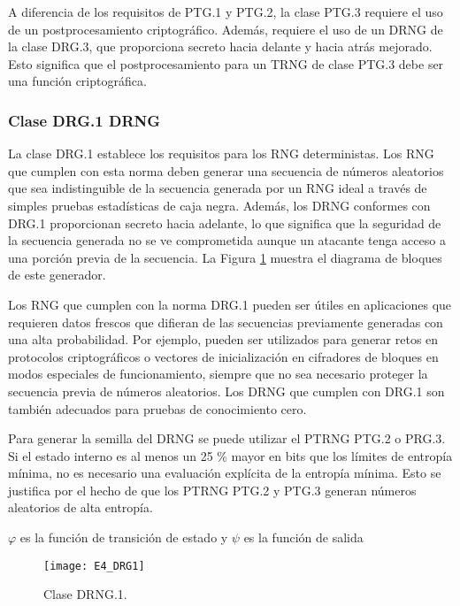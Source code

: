                 A diferencia de los requisitos de PTG.1 y PTG.2, la clase PTG.3 requiere el uso de un postprocesamiento criptográfico. Además, requiere el uso de un DRNG de la clase DRG.3, que proporciona secreto hacia delante y hacia atrás mejorado. Esto significa que el postprocesamiento para un TRNG de clase PTG.3 debe ser una función criptográfica.

            \subsubsection{Clase DRG.1 DRNG}

                La clase DRG.1 establece los requisitos para los RNG deterministas. Los RNG que cumplen con esta norma deben generar una secuencia de números aleatorios que sea indistinguible de la secuencia generada por un RNG ideal a través de simples pruebas estadísticas de caja negra. Además, los DRNG conformes con DRG.1 proporcionan secreto hacia adelante, lo que significa que la seguridad de la secuencia generada no se ve comprometida aunque un atacante tenga acceso a una porción previa de la secuencia. La Figura \ref{fig:E4_DRG1} muestra el diagrama de bloques de este generador.

                Los RNG que cumplen con la norma DRG.1 pueden ser útiles en aplicaciones que requieren datos frescos que difieran de las secuencias previamente generadas con una alta probabilidad. Por ejemplo, pueden ser utilizados para generar retos en protocolos criptográficos o vectores de inicialización en cifradores de bloques en modos especiales de funcionamiento, siempre que no sea necesario proteger la secuencia previa de números aleatorios. Los DRNG que cumplen con DRG.1 son también adecuados para pruebas de conocimiento cero. \cite{AIS2011}

                Para generar la semilla del DRNG se puede utilizar el PTRNG PTG.2 o PRG.3. Si el estado interno es al menos un 25 \% mayor en bits que los límites de entropía mínima, no es necesario una evaluación explícita de la entropía mínima. Esto se justifica por el hecho de que los PTRNG PTG.2 y PTG.3 generan números aleatorios de alta entropía.

                $\varphi$ es la función de transición de estado y $\psi$ es la función de salida

                \begin{figure}[hbtp]
                    \caption{Clase DRNG.1.}
                    \centering
                    \texttt{[image: E4\_DRG1]}
                    \label{fig:E4_DRG1}
                \end{figure}


